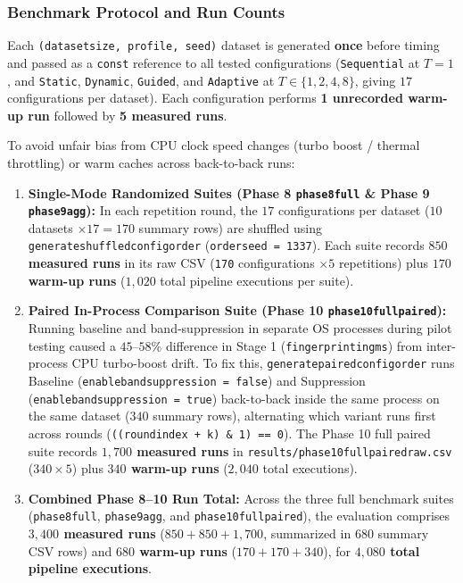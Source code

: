 \documentclass[11pt,a4paper]{article}
\renewcommand{\_}{\textunderscore\allowbreak}
\begin{document}
\subsubsection*{Benchmark Protocol and Run Counts}
Each \texttt{(dataset\_size, profile, seed)} dataset is generated \textbf{once} before timing and passed as a \texttt{const} reference to all tested configurations (\texttt{Sequential} at $T=1$, and \texttt{Static}, \texttt{Dynamic}, \texttt{Guided}, and \texttt{Adaptive} at $T \in \{1, 2, 4, 8\}$, giving $17$ configurations per dataset). Each configuration performs \textbf{1 unrecorded warm-up run} followed by \textbf{5 measured runs}.

To avoid unfair bias from CPU clock speed changes (turbo boost / thermal throttling) or warm caches across back-to-back runs:
\begin{enumerate}
    \item \textbf{Single-Mode Randomized Suites (Phase 8 \texttt{phase8\_full} \& Phase 9 \texttt{phase9\_agg}):} In each repetition round, the $17$ configurations per dataset ($10$ datasets $\times 17 = 170$ summary rows) are shuffled using \texttt{generate\_shuffled\_config\_order} (\texttt{order\_seed = 1337}). Each suite records \textbf{$850$ measured runs} in its raw CSV (\texttt{170} configurations $\times 5$ repetitions) plus \textbf{$170$ warm-up runs} ($1,020$ total pipeline executions per suite).
    \item \textbf{Paired In-Process Comparison Suite (Phase 10 \texttt{phase10\_full\_paired}):} Running baseline and band-suppression in separate OS processes during pilot testing caused a $45\text{--}58\%$ difference in Stage 1 (\texttt{fingerprinting\_ms}) from inter-process CPU turbo-boost drift. To fix this, \texttt{generate\_paired\_config\_order} runs Baseline (\texttt{enable\_band\_suppression = false}) and Suppression (\texttt{enable\_band\_suppression = true}) back-to-back inside the same process on the same dataset ($340$ summary rows), alternating which variant runs first across rounds (\texttt{((round\_index + k) \& 1) == 0}). The Phase 10 full paired suite records \textbf{$1,700$ measured runs} in \texttt{results/phase10\_full\_paired\_raw.csv} ($340 \times 5$) plus \textbf{$340$ warm-up runs} ($2,040$ total executions).
    \item \textbf{Combined Phase 8--10 Run Total:} Across the three full benchmark suites (\texttt{phase8\_full}, \texttt{phase9\_agg}, and \texttt{phase10\_full\_paired}), the evaluation comprises \textbf{$3,400$ measured runs} ($850 + 850 + 1,700$, summarized in $680$ summary CSV rows) and \textbf{$680$ warm-up runs} ($170 + 170 + 340$), for \textbf{$4,080$ total pipeline executions}.
\end{enumerate}
\end{document}

